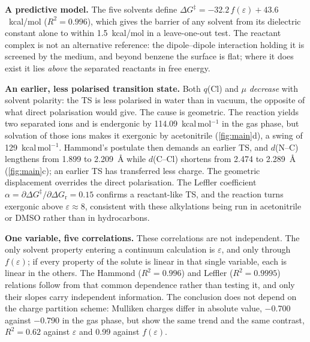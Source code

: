 \documentclass[10pt,a4paper]{article}
\begin{document}
\textbf{A predictive model.} The five solvents define
$\Delta G^{\ddagger} = -32.2\,f(\varepsilon) + 43.6$~kcal/mol
($R^{2} = 0.996$), which gives the barrier of any solvent from its
dielectric constant alone to within 1.5~kcal/mol in a leave-one-out test.
The reactant complex is not an alternative reference: the dipole--dipole
interaction holding it is screened by the medium, and beyond benzene the
surface is flat; where it does exist it lies \emph{above} the separated
reactants in free energy.

\textbf{An earlier, less polarised transition state.} Both $q$(Cl) and
$\mu$ \emph{decrease} with solvent polarity: the TS is less polarised in
water than in vacuum, the opposite of what direct polarisation would give.
The cause is geometric. The reaction yields two separated ions and is
endergonic by \num{114.09}~kcal\,mol$^{-1}$ in the gas phase, but
solvation of those ions makes it exergonic by acetonitrile
(\cref{fig:main}d), a swing of \num{129}~kcal\,mol$^{-1}$. Hammond's
postulate then demands an earlier TS, and $d$(N--C) lengthens from
\num{1.899} to \SI{2.209}{\angstrom} while $d$(C--Cl) shortens from
\num{2.474} to \SI{2.289}{\angstrom} (\cref{fig:main}c); an earlier TS has
transferred less charge. The geometric displacement overrides the direct
polarisation. The Leffler coefficient
$\alpha = \partial\Delta G^{\ddagger}/\partial\Delta G_\mathrm{r} = 0.15$
confirms a reactant-like TS, and the reaction turns exergonic above
$\varepsilon \approx 8$, consistent with these alkylations being run in
acetonitrile or DMSO rather than in hydrocarbons.

\textbf{One variable, five correlations.} These correlations are not
independent. The only solvent property entering a continuum calculation is
$\varepsilon$, and only through $f(\varepsilon)$; if every property of the
solute is linear in that single variable, each is linear in the others. The
Hammond ($R^{2} = 0.996$) and Leffler ($R^{2} = 0.9995$) relations follow
from that common dependence rather than testing it, and only their slopes
carry independent information. The conclusion does not depend on the charge
partition scheme: Mulliken charges differ in absolute value, \num{-0.700}
against \num{-0.790} in the gas phase, but show the same trend and the same
contrast, $R^{2} = 0.62$ against $\varepsilon$ and \num{0.99} against
$f(\varepsilon)$.
\end{document}
